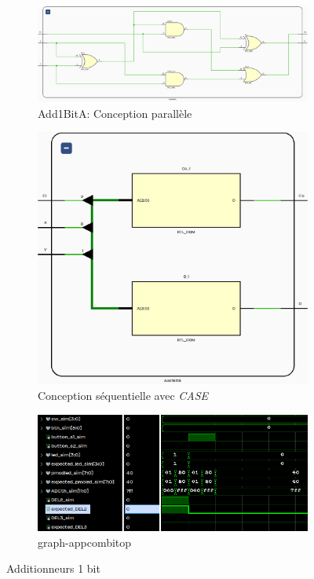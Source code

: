 \begin{figure}[H]
	\centering
	\begin{subfigure}{0.60 \linewidth}
		\centering
		\vfill
		\includegraphics[width=\textwidth]{assets/img/schematic-add1bita.png}
		\caption{Add1BitA: Conception parallèle}
	\end{subfigure} \hfill
	\begin{subfigure}{0.39 \linewidth}
		\centering
		\includegraphics[width=\textwidth]{assets/img/schematic-add1bitb.png}
		\caption{Conception séquentielle avec \textit{CASE}}
	\end{subfigure}
	\begin{subfigure}{.49\linewidth}
		\centering
		\includegraphics[width=\textwidth]{assets/img/graph-appcombitop.png}
		\caption{graph-appcombitop}
	\end{subfigure}
	\caption{Additionneurs 1 bit}
\end{figure}



